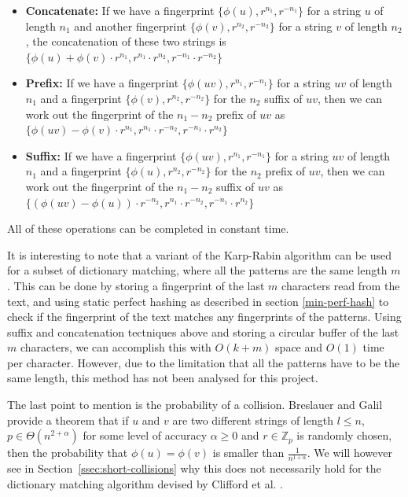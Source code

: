\documentclass[ %
                    author={Dominic Joseph Moylett},
                    degree={MEng},
                     title={Dictionary Matching with Fingerprints},
                  subtitle={An Empirical Analysis},
                      type={research},
                      year={2015} ]{dissertation}
\begin{document}
\begin{itemize}
  \item \textbf{Concatenate:} If we have a fingerprint $\{\phi(u), r^{n_1}, r^{-n_1}\}$ for a string $u$ of length $n_1$ and another fingerprint $\{\phi(v), r^{n_2}, r^{-n_2}\}$ for a string $v$ of length $n_2$, the concatenation of these two strings is $\{\phi(u) + \phi(v)\cdot r^{n_1}, r^{n_1} \cdot r^{n_2}, r^{-n_1} \cdot r^{-n_2}\}$
  \item \textbf{Prefix:} If we have a fingerprint $\{\phi(uv), r^{n_1}, r^{-n_1}\}$ for a string $uv$ of length $n_1$ and a fingerprint $\{\phi(v), r^{n_2}, r^{-n_2}\}$ for the $n_2$ suffix of $uv$, then we can work out the fingerprint of the $n_1 - n_2$ prefix of $uv$ as $\{\phi(uv) - \phi(v)\cdot r^{n_1}, r^{n_1} \cdot r^{-n_2}, r^{-n_1} \cdot r^{n_2}\}$
  \item \textbf{Suffix:} If we have a fingerprint $\{\phi(uv), r^{n_1}, r^{-n_1}\}$ for a string $uv$ of length $n_1$ and a fingerprint $\{\phi(u), r^{n_2}, r^{-n_2}\}$ for the $n_2$ prefix of $uv$, then we can work out the fingerprint of the $n_1 - n_2$ suffix of $uv$ as $\{(\phi(uv) - \phi(u))\cdot r^{-n_2}, r^{n_1} \cdot r^{-n_2}, r^{-n_1} \cdot r^{n_2}\}$
\end{itemize}

All of these operations can be completed in constant time.

It is interesting to note that a variant of the Karp-Rabin algorithm can be used for a subset of dictionary matching, where all the patterns are the same length $m$ \cite{candan:data}. This can be done by storing a fingerprint of the last $m$ characters read from the text, and using static perfect hashing as described in section \ref{min-perf-hash} to check if the fingerprint of the text matches any fingerprints of the patterns. Using suffix and concatenation tectniques above and storing a circular buffer of the last $m$ characters, we can accomplish this with $O(k + m)$ space and $O(1)$ time per character. However, due to the limitation that all the patterns have to be the same length, this method has not been analysed for this project.

The last point to mention is the probability of a collision. Breslauer and Galil \cite{Breslauer:2014:RSS:2660854.2635814} provide a theorem that if $u$ and $v$ are two different strings of length $l \leq n$, $p \in \Theta(n^{2 + \alpha})$ for some level of accuracy $\alpha \geq 0$ and $r \in \mathbb{Z}_p$ is randomly chosen, then the probability that $\phi(u) = \phi(v)$ is smaller than $\frac{1}{n^{1 + \alpha}}$. We will however see in Section~\ref{ssec:short-collisions} why this does not necessarily hold for the dictionary matching algorithm devised by Clifford et al. \cite{2015arXiv150406242C}.
\end{document}
